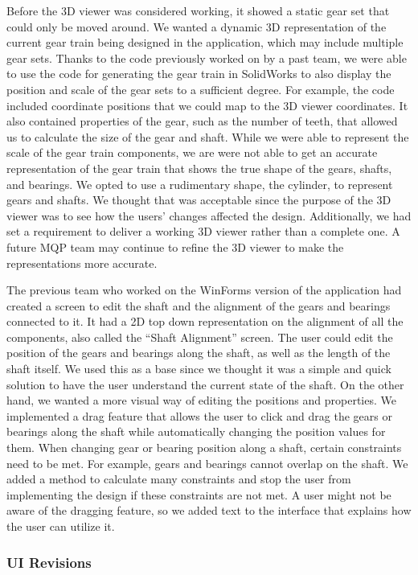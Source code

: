 \begin{doublespace}
Before the 3D viewer was considered working, it showed a static gear set that could only be moved around. We wanted a dynamic 3D representation of the current gear train being designed in the application, which may include multiple gear sets. Thanks to the code previously worked on by a past team, we were able to use the code for generating the gear train in SolidWorks to also display the position and scale of the gear sets to a sufficient degree. For example, the code included coordinate positions that we could map to the 3D viewer coordinates. It also contained properties of the gear, such as the number of teeth, that allowed us to calculate the size of the gear and shaft. While we were able to represent the scale of the gear train components, we are were not able to get an accurate representation of the gear train that shows the true shape of the gears, shafts, and bearings. We opted to use a rudimentary shape, the cylinder, to represent gears and shafts. We thought that was acceptable since the purpose of the 3D viewer was to see how the users' changes affected the design. Additionally, we had set a requirement to deliver a working 3D viewer rather than a complete one. A future MQP team may continue to refine the 3D viewer to make the representations more accurate.

The previous team who worked on the WinForms version of the application had created a screen to edit the shaft and the alignment of the gears and bearings connected to it. It had a 2D top down representation on the alignment of all the components, also called the ``Shaft Alignment'' screen. The user could edit the position of the gears and bearings along the shaft, as well as the length of the shaft itself. We used this as a base since we thought it was a simple and quick solution to have the user understand the current state of the shaft. On the other hand, we wanted a more visual way of editing the positions and properties. We implemented a drag feature that allows the user to click and drag the gears or bearings along the shaft while automatically changing the position values for them. When changing gear or bearing position along a shaft, certain constraints need to be met. For example, gears and bearings cannot overlap on the shaft. We added a method to calculate many constraints and stop the user from implementing the design if these constraints are not met. A user might not be aware of the dragging feature, so we added text to the interface that explains how the user can utilize it.

\subsubsection{UI Revisions}


\end{doublespace}
